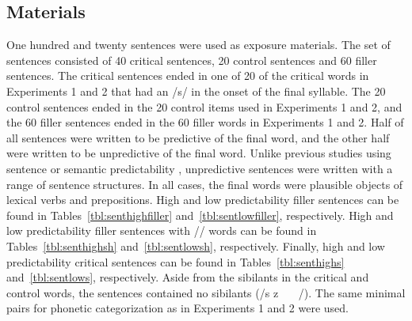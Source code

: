 \subsection{Materials}

One hundred and twenty sentences were used as exposure materials.  
The set of sentences consisted of 40 critical sentences, 20 control sentences and 60 filler sentences. 
The critical sentences ended in one of 20 of the critical words in Experiments 1 and 2 that had an /s/ in the onset of the final syllable.  
The 20 control sentences ended in the 20 control items used in Experiments 1 and 2, and the 60 filler sentences ended in the 60 filler words in Experiments 1 and 2.  
Half of all sentences were written to be predictive of the final word, and the other half were written to be unpredictive of the final word.  
Unlike previous studies using sentence or semantic predictability \citep{Kalikow1977}, unpredictive sentences were written with a range of sentence structures.
In all cases, the final words were plausible objects of lexical verbs and prepositions.
High and low predictability filler sentences can be found in Tables~\ref{tbl:senthighfiller} and~\ref{tbl:sentlowfiller}, respectively.
High and low predictability filler sentences with /\textesh/ words can be found in Tables~\ref{tbl:senthighsh} and~\ref{tbl:sentlowsh}, respectively.
Finally, high and low predictability critical sentences can be found in Tables~\ref{tbl:senthighs} and~\ref{tbl:sentlows}, respectively.
Aside from the sibilants in the critical and control words, the sentences contained no sibilants (/s z \textesh\ \textyogh\ \textteshlig\  \textdyoghlig/).  
The same minimal pairs for phonetic categorization as in Experiments 1 and 2 were used.

